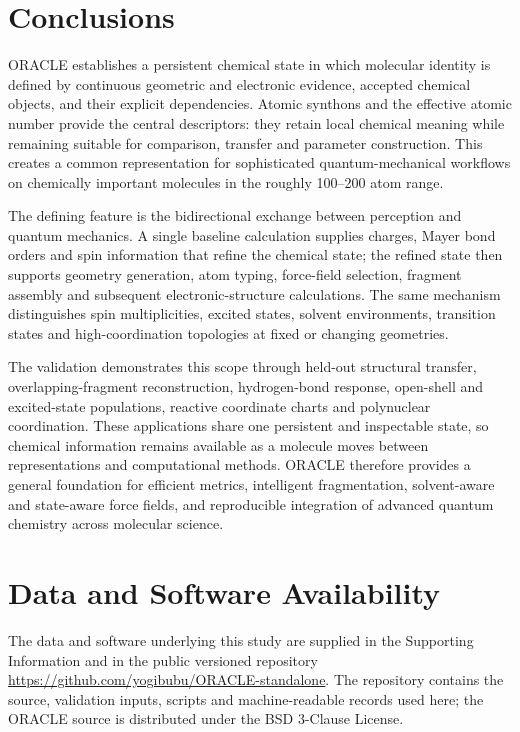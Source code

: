 \documentclass[journal=jctcce,manuscript=article]{achemso}
\begin{document}
\section{Conclusions}

ORACLE establishes a persistent chemical state in which molecular identity is
defined by continuous geometric and electronic evidence, accepted chemical
objects, and their explicit dependencies.  Atomic synthons and the effective
atomic number provide the central descriptors: they retain local chemical
meaning while remaining suitable for comparison, transfer and parameter
construction.  This creates a common representation for sophisticated
quantum-mechanical workflows on chemically important molecules in the
roughly 100--200 atom range.

The defining feature is the bidirectional exchange between perception and
quantum mechanics.  A single baseline calculation supplies charges, Mayer
bond orders and spin information that refine the chemical state; the refined
state then supports geometry generation, atom typing, force-field selection,
fragment assembly and subsequent electronic-structure calculations.  The
same mechanism distinguishes spin multiplicities, excited states, solvent
environments, transition states and high-coordination topologies at fixed or
changing geometries.

The validation demonstrates this scope through held-out structural transfer,
overlapping-fragment reconstruction, hydrogen-bond response, open-shell and
excited-state populations, reactive coordinate charts and polynuclear
coordination.  These applications share one persistent and inspectable state,
so chemical information remains available as a molecule moves between
representations and computational methods.  ORACLE therefore provides a
general foundation for efficient metrics, intelligent fragmentation,
solvent-aware and state-aware force fields, and reproducible integration of
advanced quantum chemistry across molecular science.

\section*{Data and Software Availability}

The data and software underlying this study are supplied in the Supporting
Information and in the public versioned repository
\url{https://github.com/yogibubu/ORACLE-standalone}.  The repository contains
the source, validation inputs, scripts and machine-readable records used here;
the ORACLE source is distributed under the BSD 3-Clause License.
\end{document}
